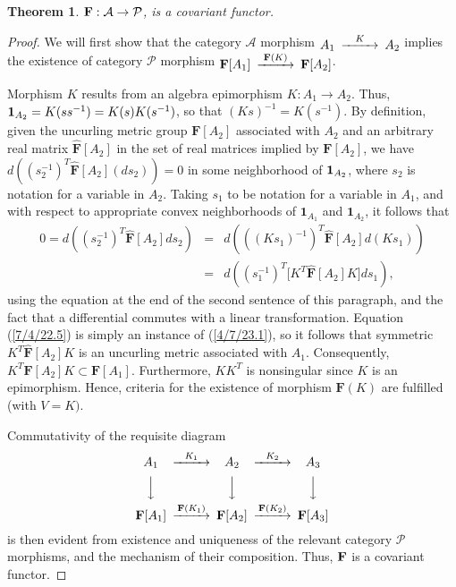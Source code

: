 \documentclass{amsart}
\numberwithin{equation}{section}
\newtheorem{theorem}{Theorem}
\theoremstyle{definition}
\numberwithin{theorem}{section}
\begin{document}
\begin{theorem}\label{6/13/22.1}  ${\bf F}: \mathcal{A}\rightarrow \mathcal{P}$, is a covariant functor. 
 \end{theorem}
 \begin{proof}
We will first show that the category $\mathcal{A}$ morphism $ \begin{CD}  A_1 @>K>> A_2\end{CD}$ implies the existence of category $\mathcal{P}$ morphism $ \begin{CD}  {\bf F}[A_1] @>{\bf F}(K)>> {\bf F}[A_2]\end{CD}$.

Morphism $K$ results from an algebra epimorphism $K:A_1\rightarrow A_2$.   Thus, ${\bf 1}_{A_2} = K(ss^{-1}) = K(s)K(s^{-1})$, so that $(Ks)^{-1} = K(s^{-1})$.  By definition, given the uncurling metric group $\mathbf{F}[A_2]$ associated with $A_2$ and an arbitrary real matrix  $\hat{\mathbf{F}}[A_2]$ in the set of real matrices implied by $\mathbf{F}[A_2]$, we have $d\left((s_2^{-1})^T\hat{\mathbf{F}}[A_2] (ds_2)\right) = 0$ in some neighborhood of ${\bf 1}_{A_2}$, where $s_2$ is notation for a variable in $A_2$.  Taking $s_1$ to be notation for a variable in $A_1$, and with respect to appropriate convex neighborhoods of $\mathbf{1}_{A_1}$ and $\mathbf{1}_{A_2}$, it follows that \begin{eqnarray}\nonumber 0 = d\left((s_2^{-1})^T\hat{\mathbf{F}}[A_2] ds_2\right) &=&  d\left(((Ks_1)^{-1})^T\hat{\mathbf{F}}[A_2] d(Ks_1)\right) \\  &=& d\left((s_1^{-1})^T \big[K^T \hat{\mathbf{F}}[A_2]K\big]ds_1\right), \label{7/4/22.5}  \end{eqnarray}   using the equation at the end of the second sentence of this paragraph, and the fact that a differential commutes with a linear transformation.  Equation (\ref{7/4/22.5}) is simply an instance of (\ref{4/7/23.1}), so it follows that symmetric $K^T \hat{\mathbf{F}}[A_2]K$ is an uncurling metric associated with $A_1$.  Consequently, $K^T\mathbf{F}[A_2]K\subset \mathbf{F}[A_1]$.  Furthermore, $KK^T$ is nonsingular since $K$ is an epimorphism.  Hence, criteria for the existence of morphism $\mathbf{F}(K)$ are fulfilled (with $V=K)$.

Commutativity of the requisite diagram
  \[  \begin{CD}  
A_1 @>K_1>> A_2 @>K_2>> A_3\\
 @VVV   @VVV  @VVV\\
 {\bf F}[A_1]   @>{\bf F}(K_1)>>  {\bf F}[A_2]  @>{\bf F}(K_2)>>  {\bf F}[A_3] \\ 
 \end{CD} \]
is then evident from existence and uniqueness of the relevant category $\mathcal{P}$ morphisms, and the mechanism of their composition.  Thus, ${\bf F}$ is a covariant functor. 
\end{proof}
\end{document}
